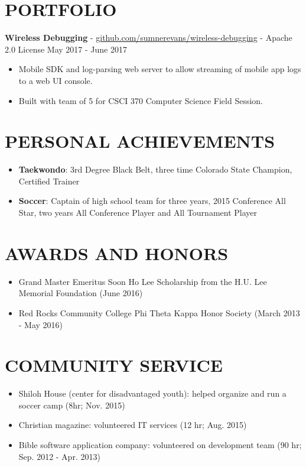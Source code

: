 \documentclass[10.5pt,letterpaper]{article}
\begin{document}
\section*{PORTFOLIO}
\textbf{Wireless Debugging} -
\href{https://github.com/sumnerevans/wireless-debugging}{github.com/sumnerevans/wireless-debugging}
- Apache 2.0 License \hfill May 2017 - June 2017
\begin{itemize}
    \item Mobile SDK and log-parsing web server to allow streaming of mobile app
        logs to a web UI console.
    \item Built with team of 5 for CSCI 370 Computer Science Field Session.
\end{itemize}

\section*{PERSONAL ACHIEVEMENTS}
\begin{itemize}
    \item \textbf{Taekwondo}: 3rd Degree Black Belt, three time Colorado State
        Champion, Certified Trainer
    \item \textbf{Soccer}: Captain of high school team for three years, 2015
        Conference All Star, two years All Conference Player and All Tournament
        Player
\end{itemize}

\section*{AWARDS AND HONORS}
\begin{itemize}
    \item Grand Master Emeritus Soon Ho Lee Scholarship from the H.U. Lee
        Memorial Foundation (June 2016)
    \item Red Rocks Community College Phi Theta Kappa Honor Society (March 2013
        - May 2016)
\end{itemize}

\section*{COMMUNITY SERVICE}
\begin{itemize}
    \item Shiloh House (center for disadvantaged youth): helped organize and run
        a soccer camp (8hr; Nov. 2015)
    \item Christian magazine: volunteered IT services (12 hr; Aug. 2015)
    \item Bible software application company: volunteered on development team
        (90 hr; Sep.  2012 - Apr. 2013)
\end{itemize}
\end{document}
